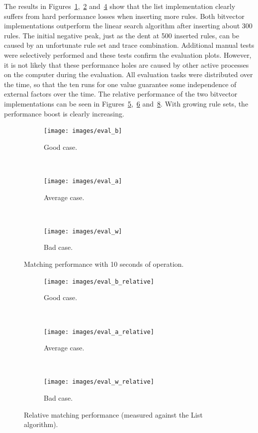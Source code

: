 \documentclass[a4paper,
		12pt,
		parskip=full,
		titlepage
		]{scrartcl}
\begin{document}
The results in Figures~\ref{fig:eval_good_case},~\ref{fig:eval_average_case} and~\ref{fig:eval_bad_case} show that the list implementation
clearly suffers from hard performance losses when inserting more rules.
Both bitvector implementations outperform the linear search algorithm after inserting about 300 rules.
The initial negative peak, just as the dent at 500 inserted rules, can be caused by an unfortunate rule set and trace combination.
Additional manual tests were selectively performed and these tests confirm the evaluation plots.
However, it is not likely that these performance holes are caused by other active processes on the computer during the evaluation.
All evaluation tasks were distributed over the time, so that the ten runs 
for one value guarantee some independence of external factors over the time.
The relative performance of the two bitvector implementations can be seen in
Figures~\ref{fig:eval_good_case_relative},~\ref{fig:eval_average_case_relative} and~\ref{fig:eval_bad_case_relative}.
With growing rule sets, the performance boost is clearly increasing.

\begin{figure}
    \centering
    \begin{subfigure}{.45\linewidth}
        \centering
        \texttt{[image: images/eval\_b]}
        \caption{Good case.}
        \label{fig:eval_good_case}
    \end{subfigure}
    ~
    \begin{subfigure}{.45\linewidth}
        \centering
        \texttt{[image: images/eval\_a]}
        \caption{Average case.}
        \label{fig:eval_average_case}
    \end{subfigure}
    ~
    \begin{subfigure}{.45\linewidth}
        \centering
        \texttt{[image: images/eval\_w]}
        \caption{Bad case.}
        \label{fig:eval_bad_case}
    \end{subfigure}
    \caption{Matching performance with 10 seconds of operation.}
\end{figure}

\begin{figure}
    \centering
    \begin{subfigure}{.45\linewidth}
        \centering
        \texttt{[image: images/eval\_b\_relative]}
        \caption{Good case.}
        \label{fig:eval_good_case_relative}
    \end{subfigure}
    ~
    \begin{subfigure}{.45\linewidth}
        \centering
        \texttt{[image: images/eval\_a\_relative]}
        \caption{Average case.}
        \label{fig:eval_average_case_relative}
    \end{subfigure}
    ~
    \begin{subfigure}{.45\linewidth}
        \centering
        \texttt{[image: images/eval\_w\_relative]}
        \caption{Bad case.}
        \label{fig:eval_bad_case_relative}
    \end{subfigure}
    \caption{Relative matching performance (measured against the List algorithm).}
\end{figure}
\end{document}
